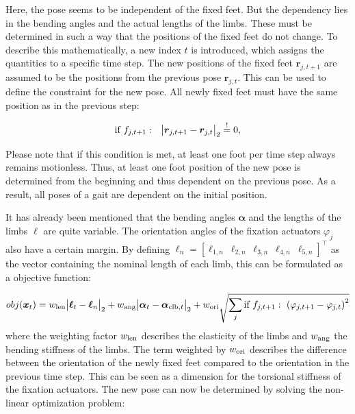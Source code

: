 \documentclass[10pt,a4paper]{article}
\begin{document}
Here, the pose seems to be independent of the fixed feet.
But the dependency lies in the bending angles and the actual lengths of the limbs. 
These must be determined in such a way that the positions of the fixed feet do not change.
To describe this mathematically, a new index $t$ is introduced, which assigns the quantities to a specific time step.
The new positions of the fixed feet $\bm{r}_{j,t+1}$ are assumed to be the positions from the previous pose $\bm{r}_{j,t}$.
This can be used to define the constraint for the new pose.
All newly fixed feet must have the same position as in the previous step:
%

\newcommand{\mbeq}{\overset{!}{=}}
\begin{equation}
\textnormal{if}~f_{j,t+1}:~~\big|\bm{r}_{j,t+1} - \bm{r}_{j,t}\big|_2 \mbeq 0,
\label{eq:constraint}
\end{equation}

Please note that if this condition is met, at least one foot per time step always remains motionless.
Thus, at least one foot position of the new pose is determined from the beginning and thus dependent on the previous pose.
As a result, all poses of a gait are dependent on the initial position.



It has already been mentioned that the bending angles $\bm{\alpha}$ and the lengths of the limbs $\bm{\ell}$ are quite variable. 
The orientation angles of the fixation actuators $\varphi_j$ also have a certain margin.
By defining $\bm{\ell}_n = \left[ \ell_{1,n}~\ell_{2,n}~\ell_{3,n}~\ell_{4,n}~\ell_{5,n} \right]^\top$ as the vector containing the nominal length of each limb,
this can be formulated as a objective function:

\begin{equation}
obj(\bm{x}_t) = 
  w_{\textnormal{len}}\big| \bm{\ell}_t - \bm{\ell}_n \big|_2
+ w_{\textnormal{ang}}\big| \bm{\alpha}_t - \bm{\alpha}_{\textnormal{clb},t} \big|_2
+ w_{\textnormal{ori}}\sqrt{\sum_j \textnormal{if}~f_{j,t+1}:~\left( \varphi_{j,t+1} - \varphi_{j, t} \right)^2}
\label{eq:objective_function}
\end{equation}
where the weighting factor $w_{\textnormal{len}}$ describes the elasticity of the limbs and $w_{\textnormal{ang}}$ the bending stiffness of the limbs.
The term weighted by $w_{\textnormal{ori}}$ describes the difference between the orientation of the newly fixed feet compared to the orientation in the previous time step.
This can be seen as a dimension for the torsional stiffness of the fixation actuators.
The new pose can now be determined by solving the non-linear optimization problem:
\end{document}
